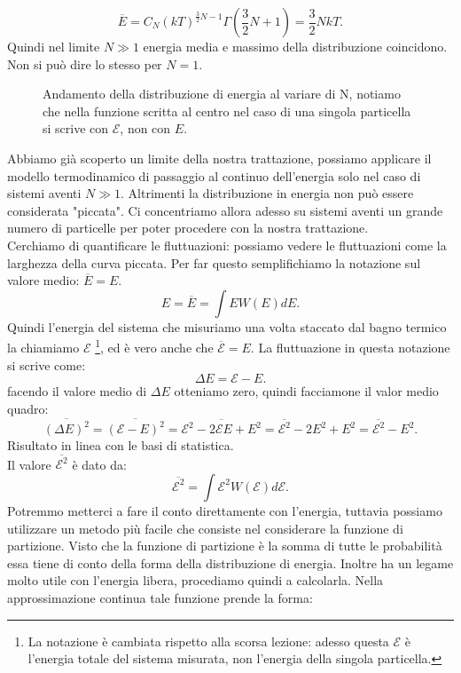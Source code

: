 \[
	\overline{E} = C_{N} \left( kT \right) ^{\frac{3}{2}N-1} \Gamma \left( \frac{3}{2}N +1 \right) = \frac{3}{2}N kT
.\] 
Quindi nel limite $N\gg 1$ energia media e massimo della distribuzione coincidono. Non si può dire lo stesso per $N= 1$.
\begin{figure}[H]
    \centering
    \caption{\scriptsize Andamento della distribuzione di energia al variare di N, notiamo che nella funzione scritta al centro nel caso di una singola particella si scrive con $\mathcal{E}$, non con $E$.}
    \label{fig:andamento-della-distribuzione-di-energia-al-variare-di-n}
\end{figure}
\noindent
Abbiamo già scoperto un limite della nostra trattazione, possiamo applicare il modello termodinamico di passaggio al continuo dell'energia solo nel caso di sistemi aventi $N \gg 1$. Altrimenti la distribuzione in energia non può essere considerata "piccata". Ci concentriamo allora adesso su sistemi aventi un grande numero di particelle per poter procedere con la nostra trattazione.\\
Cerchiamo di quantificare le fluttuazioni: possiamo vedere le fluttuazioni come la larghezza della curva piccata. Per far questo semplifichiamo la notazione sul valore medio: $\overline{E} = E$.
\[
	E =  \overline{E} = \int E W( E ) dE
.\] 
Quindi l'energia del sistema che misuriamo una volta staccato dal bagno termico la chiamiamo $\mathcal{E}$ \footnote{La notazione è cambiata rispetto alla scorsa lezione: adesso questa $\mathcal{E}$ è l'energia totale del sistema misurata, non l'energia della singola particella.}, ed è vero anche che $\overline{\mathcal{E}}= E$. La fluttuazione in questa notazione si scrive come:
\[
	\Delta E = \mathcal{E}- E 
.\] 
facendo il valore medio di $\Delta E $ otteniamo zero, quindi facciamone il valor medio quadro:
\[
	\overline{\left( \Delta E \right) ^2} = \overline{\left( \mathcal{E} - E \right)^2 } = \overline{\mathcal{E}^2- 2\mathcal{E} E + E^2}= 
	\overline{\mathcal{E}^2} - 2 E^2 + E^2 = \overline{\mathcal{E}^2} - E^2
.\] 
Risultato in linea con le basi di statistica. \\
Il valore $\overline{\mathcal{E}^2}$ è dato da:
\[
	\overline{\mathcal{E}^2} = \int \mathcal{E}^2 W( \mathcal{E}) d\mathcal{E}
.\] 
Potremmo metterci a fare il conto direttamente con l'energia, tuttavia possiamo utilizzare un metodo più facile che consiste nel considerare la funzione di partizione. Visto che la funzione di partizione è la somma di tutte le probabilità essa tiene di conto della forma della distribuzione di energia. Inoltre ha un legame molto utile con l'energia libera, procediamo quindi a calcolarla. Nella approssimazione continua tale funzione prende la forma:
